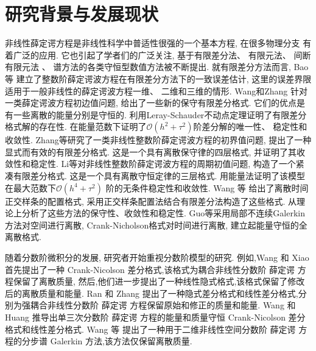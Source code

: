 \section{研究背景与发展现状}
非线性薛定谔方程是非线性科学中普适性很强的一个基本方程, 在很多物理分支 有着广泛的应用. 它也引起了学者们的广泛关注, 基于有限差分法\cite{liFastEnergyConserving2018}、 有限元法\cite{karakashianSpacetimeFiniteElement1998}、 间断有限元法\cite{zhangConservativeLocalDiscontinuous2017} 、 谱方法\cite{gongConservativeFourierPseudospectral2017}的各类守恒型数值方法被不断提出. 
就有限差分方法而言, Bao等\cite{baoUniformErrorEstimates2012} 建立了整数阶薛定谔波方程在有限差分方法下的一致误差估计, 这里的误差界限适用于一般非线性的薛定谔波方程一维、 二维和三维的情形. 
Wang和Zhang\cite{wangAnalysisNewConservative2006} 针对一类薛定谔波方程初边值问题, 给出了一些新的保守有限差分格式. 它们的优点是有一些离散的能量分别是守恒的. 利用Leray-Schauder不动点定理证明了有限差分 格式解的存在性. 
在能量范数下证明了$\mathcal{O}(h^2+\tau^2)$阶差分解的唯一性、 稳定性和收敛性. Zhang等\cite{zhangConservativeNumericalScheme2003}研究了一类非线性整数阶薛定谔波方程的初界值问题, 提出了一种显式而有效的有限差分格式. 
这是一个具有离散保守律的四层格式, 并证明了其收敛性和稳定性. Li等\cite{liCompactFiniteDifference2012}对非线性整数阶薛定谔波方程的周期初值问题, 构造了一个紧凑有限差分格式. 
这是一个具有离散守恒定律的三层格式. 用能量法证明了该模型在最大范数下$\mathcal{O}(h^4+\tau^2)$ 阶的无条件稳定性和收敛性. Wang 等\cite{wangDiscretetimeOrthogonalSpline2011} 给出了离散时间正交样条的配置格式, 采用正交样条配置法结合有限差分法构造了这些格式. 
从理论上分析了这些方法的保守性、收敛性和稳定性. Guo等\cite{guoEnergyConservingLocal2015}采用局部不连续Galerkin方法对空间进行离散, Crank-Nicholson格式对时间进行离散, 建立起能量守恒的全离散格式. 

随着分数阶微积分的发展, 研究者开始重视分数阶模型的研究.
例如,Wang 和 Xiao \cite{wangCrankNicolsonDifference2013} 首先提出了一种 Crank-Nicolson 差分格式,该格式为耦合非线性分数阶 薛定谔 方程保留了离散质量,
然后,他们进一步提出了一种线性隐式格式,该格式保留了修改后的离散质量和能量\cite{wangLinearlyImplicitConservative2014}. 
Ran 和 Zhang \cite{ranConservativeDifferenceScheme2016} 提出了一种隐式差分格式和线性差分格式,分别为强耦合非线性分数阶 薛定谔 方程保留原始和修正的质量和能量. 
Wang 和 Huang \cite{wangEnergyConservativeDifference2015,wangConservativeLinearizedDifference2015} 推导出单三次分数阶 薛定谔 方程的能量和质量守恒 Crank-Nicolson 差分格式和线性差分格式.
Wang 等 \cite{wangSplitstepSpectralGalerkin2019} 提出了一种用于二维非线性空间分数阶 薛定谔 方程的分步谱 Galerkin 方法,该方法仅保留离散质量.

